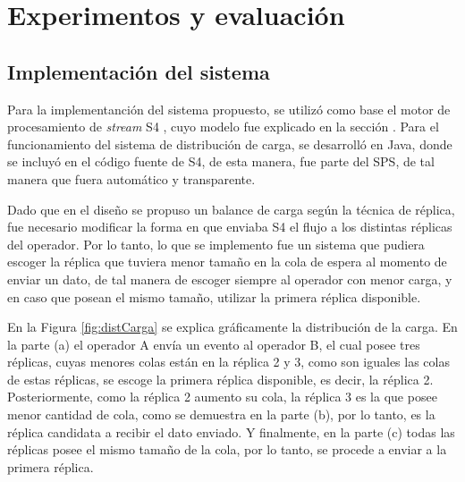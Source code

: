 \chapter{Experimentos y evaluación}
\label{cap:experimentos}

\section{Implementación del sistema}
Para la implementanción del sistema propuesto, se utilizó como base el motor de procesamiento de \textit{stream} S4 \citep{s4}, cuyo modelo fue explicado en la sección \label{sec:SP}. Para el funcionamiento del sistema de distribución de carga, se desarrolló en Java, donde se incluyó en el código fuente de S4, de esta manera, fue parte del SPS, de tal manera que fuera automático y transparente.

Dado que en el diseño se propuso un balance de carga según la técnica de réplica, fue necesario modificar la forma en que enviaba S4 el flujo a los distintas réplicas del operador. Por lo tanto, lo que se implemento fue un sistema que pudiera escoger la réplica que tuviera menor tamaño en la cola de espera al momento de enviar un dato, de tal manera de escoger siempre al operador con menor carga, y en caso que posean el mismo tamaño, utilizar la primera réplica disponible.

En la Figura \ref{fig:distCarga} se explica gráficamente la distribución de la carga. En la parte (a) el operador A envía un evento al operador B, el cual posee tres réplicas, cuyas menores colas están en la réplica 2 y 3, como son iguales las colas de estas réplicas, se escoge la primera réplica disponible, es decir, la réplica 2. Posteriormente, como la réplica 2 aumento su cola, la réplica 3 es la que posee menor cantidad de cola, como se demuestra en la parte (b), por lo tanto, es la réplica candidata a recibir el dato enviado. Y finalmente, en la parte (c) todas las réplicas posee el mismo tamaño de la cola, por lo tanto, se procede a enviar a la primera réplica.

